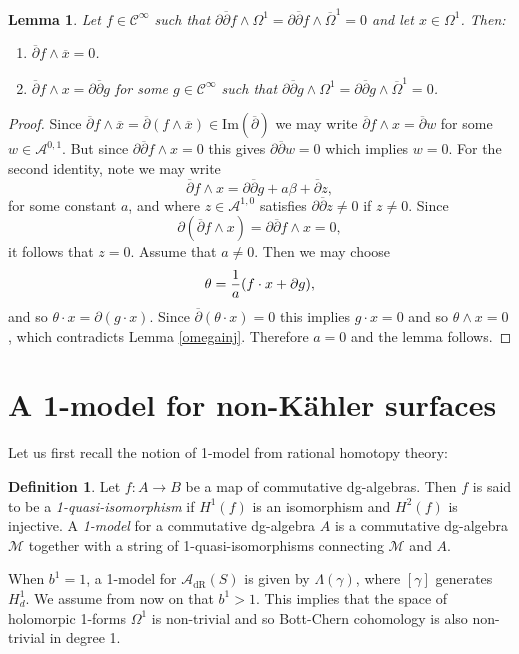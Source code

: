 \documentclass[a4paper]{amsart}
\newtheorem{lemm}[theo]{Lemma}
\theoremstyle{definition}
\newtheorem{defi}[theo]{Definition}
\newcommand{\Aa}{\mathcal{A}}
\newcommand{\Cc}{\mathcal{C}}
\newcommand{\Mm}{\mathcal{M}}
\newcommand{\ov}{\overline}
\newcommand{\del}{\partial}
\newcommand{\delb}{{\overline\partial}}
\newcommand{\dR}{\mathrm{dR}}
\begin{document}
\begin{lemm}\label{variousproducts}
Let $f\in\Cc^\infty$ such that
$\del\delb f\wedge\Omega^1=\del\delb f\wedge\ov\Omega^1=0$ and let
 $x\in\Omega^1$. Then:
\begin{enumerate}
 \item $\delb f\wedge\ov x=0$.
 \item $\delb f\wedge x=\del\delb g$ for some $g\in\Cc^\infty$ such that $\del\delb g\wedge\Omega^1=\del\delb g\wedge \ov\Omega^1=0$.
\end{enumerate}
\end{lemm}
\begin{proof}
Since $\delb f\wedge \ov x=\delb(f\wedge \ov x)\in\mathrm{Im}(\delb)$ we may write $\delb f\wedge x=\delb w$ for some $w\in\Aa^{0,1}$. But since $\del\delb f\wedge x=0$ this gives $\del\delb w=0$ which implies $w=0$.
For the second identity, note we may write 
\[\delb f\wedge x=\del\delb g+a\beta+\delb z,\]
for some constant $a$, and where $z\in \Aa^{1,0}$ satisfies $\del\delb z\neq 0$ if $z\neq 0$. Since
\[\del(\delb f\wedge x)=\del\delb f\wedge x=0,\]
it follows that $z=0$.
Assume that $a\neq 0$. Then we  may choose \[\theta={1\over a} (f\cdot x+\del g),\]
and so $\theta\cdot x= \del (g\cdot x)$.
Since $\delb (\theta\cdot x)=0$ this implies $g\cdot x=0$ and so $\theta\wedge x=0$, which contradicts Lemma \ref{omegainj}. Therefore $a=0$ and the lemma follows.
\end{proof}


\section{A 1-model for non-Kähler surfaces}

Let us first recall the notion of 1-model from rational homotopy theory:
\begin{defi}Let $f:A\to B$ be a map of commutative dg-algebras. Then $f$ is said to be a \textit{1-quasi-isomorphism} if $H^1(f)$ is an isomorphism and $H^2(f)$ is injective.
A \textit{1-model} for a commutative dg-algebra $A$ is a commutative dg-algebra $\Mm$ together with a string of 1-quasi-isomorphisms connecting $\Mm$ and $A$.
\end{defi}

When $b^1=1$, a 1-model for $\Aa_{\dR}(S)$ is given by $\Lambda(\gamma)$, where $[\gamma]$ generates $H^1_d$. We assume from now on that $b^1>1$.
This implies that the space of holomorpic 1-forms $\Omega^1$ is non-trivial and so Bott-Chern cohomology is also non-trivial in degree 1.
\end{document}
